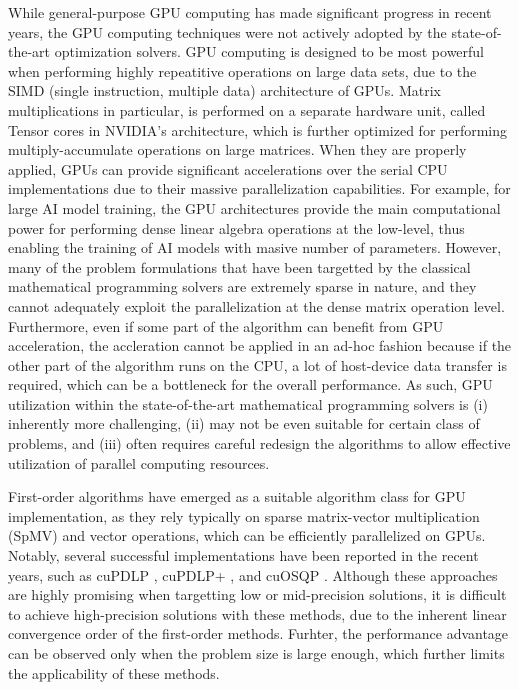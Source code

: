 \documentclass{article}
\begin{document}
While general-purpose GPU computing has made significant progress in recent years, the GPU computing techniques were not actively adopted by the state-of-the-art optimization solvers.
GPU computing is designed to be most powerful when performing highly repeatitive operations on large data sets, due to the SIMD (single instruction, multiple data) architecture of GPUs.
Matrix multiplications in particular, is performed on a separate hardware unit, called Tensor cores in NVIDIA's architecture, which is further optimized for performing multiply-accumulate operations on large matrices.
When they are properly applied, GPUs can provide significant accelerations over the serial CPU implementations due to their massive parallelization capabilities.
For example, for large AI model training, the GPU architectures provide the main computational power for performing dense linear algebra operations at the low-level, thus enabling the training of AI models with masive number of parameters.
However, many of the problem formulations that have been targetted by the classical mathematical programming solvers are extremely sparse in nature, and they cannot adequately exploit the parallelization at the dense matrix operation level.
Furthermore, even if some part of the algorithm can benefit from GPU acceleration, the accleration cannot be applied in an ad-hoc fashion because if the other part of the algorithm runs on the CPU, a lot of host-device data transfer is required, which can be a bottleneck for the overall performance.
As such, GPU utilization within the state-of-the-art mathematical programming solvers is (i) inherently more challenging, (ii) may not be even suitable for certain class of problems, and (iii) often requires careful redesign the algorithms to allow effective utilization of parallel computing resources.

First-order algorithms have emerged as a suitable algorithm class for GPU implementation, as they rely typically on sparse matrix-vector multiplication (SpMV) and vector operations, which can be efficiently parallelized on GPUs.
Notably, several successful implementations have been reported in the recent years, such as cuPDLP \cite{}, cuPDLP+ \cite{}, and cuOSQP \cite{}.
Although these approaches are highly promising when targetting low or mid-precision solutions, it is difficult to achieve high-precision solutions with these methods, due to the inherent linear convergence order of the first-order methods.
Furhter, the performance advantage can be observed only when the problem size is large enough, which further limits the applicability of these methods.
\end{document}
